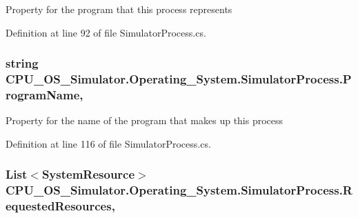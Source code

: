 Property for the program that this process represents 



Definition at line 92 of file Simulator\+Process.\+cs.

\hypertarget{class_c_p_u___o_s___simulator_1_1_operating___system_1_1_simulator_process_adbe9e17fd9415e4417646309fefbf44b}{}
\subsubsection[{Program\+Name}]{\setlength{\rightskip}{0pt plus 5cm}string C\+P\+U\+\_\+\+O\+S\+\_\+\+Simulator.\+Operating\+\_\+\+System.\+Simulator\+Process.\+Program\+Name\hspace{0.3cm}{\ttfamily [get]}, {\ttfamily [set]}}\label{class_c_p_u___o_s___simulator_1_1_operating___system_1_1_simulator_process_adbe9e17fd9415e4417646309fefbf44b}


Property for the name of the program that makes up this process 



Definition at line 116 of file Simulator\+Process.\+cs.

\hypertarget{class_c_p_u___o_s___simulator_1_1_operating___system_1_1_simulator_process_aa21683a94c1356359917ee67e46bd0fb}{}
\subsubsection[{Requested\+Resources}]{\setlength{\rightskip}{0pt plus 5cm}List$<${\bf System\+Resource}$>$ C\+P\+U\+\_\+\+O\+S\+\_\+\+Simulator.\+Operating\+\_\+\+System.\+Simulator\+Process.\+Requested\+Resources\hspace{0.3cm}{\ttfamily [get]}, {\ttfamily [set]}}\label{class_c_p_u___o_s___simulator_1_1_operating___system_1_1_simulator_process_aa21683a94c1356359917ee67e46bd0fb}


